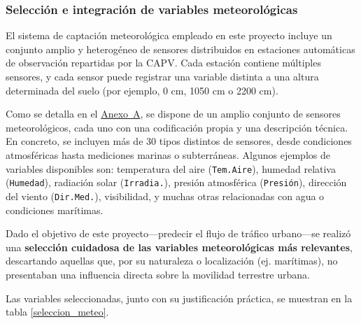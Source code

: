 \subsubsection{Selección e integración de variables meteorológicas}

El sistema de captación meteorológica empleado en este proyecto incluye un conjunto amplio y heterogéneo de sensores distribuidos en estaciones automáticas de observación repartidas por la CAPV. Cada estación contiene múltiples sensores, y cada sensor puede registrar una variable distinta a una altura determinada del suelo (por ejemplo, 0 cm, 1050 cm o 2200 cm). 

Como se detalla en el \hyperref[anexo:sensores]{Anexo~A}, se dispone de un amplio conjunto de sensores meteorológicos, cada uno con una codificación propia y una descripción técnica. En concreto, se incluyen más de 30 tipos distintos de sensores, desde condiciones atmosféricas hasta mediciones marinas o subterráneas. Algunos ejemplos de variables disponibles son: temperatura del aire (\texttt{Tem.Aire}), humedad relativa (\texttt{Humedad}), radiación solar (\texttt{Irradia.}), presión atmosférica (\texttt{Presión}), dirección del viento (\texttt{Dir.Med.}), visibilidad, y muchas otras relacionadas con agua o condiciones marítimas. 

Dado el objetivo de este proyecto—predecir el flujo de tráfico urbano—se realizó una \textbf{selección cuidadosa de las variables meteorológicas más relevantes}, descartando aquellas que, por su naturaleza o localización (ej. marítimas), no presentaban una influencia directa sobre la movilidad terrestre urbana.

Las variables seleccionadas, junto con su justificación práctica, se muestran en la tabla \ref{seleccion_meteo}.

